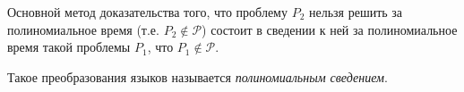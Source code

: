 Основной метод доказательства того, что проблему $P_2$ нельзя решить за полиномиальное время (т.е. $P_2\notin\mathscr{P}$) состоит в сведении к ней за полиномиальное время такой проблемы $P_1$, что $P_1\notin\mathscr{P}$. 

Такое преобразования языков называется \textit{полиномиальным сведением}.